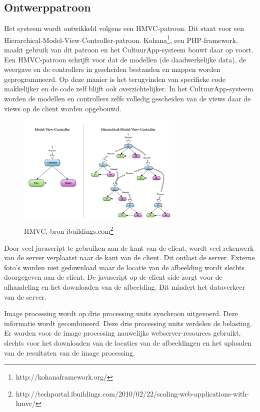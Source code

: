 \documentclass[a4paper,10pt]{article}
\begin{document}
	\subsection{Ontwerppatroon}
	\begin{itemize}
Het systeem wordt ontwikkeld volgens een HMVC-patroon. Dit staat voor een Hierarchical-Model-View-Controller-patroon. Kohana\footnote{http://kohanaframework.org/}, een PHP-framework, maakt gebruik van dit patroon en het CultuurApp-systeem bouwt daar op voort. Een HMVC-patroon schrijft voor dat de modellen (de daadwerkelijke data), de weergave en de controllers in gescheiden bestanden en mappen worden geprogrammeerd. Op deze manier is het terugvinden van specifieke code makkelijker en de code zelf blijft ook overzichtelijker. In het CultuurApp-systeem worden de modellen en controllers zelfs volledig gescheiden van de views daar de views op de client worden opgebouwd.
		\begin{figure}[ht!]
		\centering
		\includegraphics[width=8cm]{MVC-HMVC.png}
		\caption{\label{hmvc}HMVC, bron ibuildings.com\footnote{http://techportal.ibuildings.com/2010/02/22/scaling-web-applications-with-hmvc/}}
		\end{figure}
	
		Door veel javascript te gebruiken aan de kant van de client, wordt veel rekenwerk van de server verplaatst naar de kant van de client. Dit ontlast de server. Externe foto's worden niet gedownload maar de locatie van de afbeelding wordt slechts doorgegeven aan de client. De javascript op de client side zorgt voor de afhandeling en het downloaden van de afbeelding. Dit mindert het dataverkeer van de server.
	
		Image processing wordt op drie processing units synchroon uitgevoerd. Deze informatie wordt gecombineerd. Deze drie processing units verdelen de belasting. Er worden voor de image processing nauwelijks webserver-resources gebruikt, slechts voor het downloaden van de locaties van de afbeeldingen en het uploaden van de resultaten van de image processing.
	\end{itemize}
\end{document}
